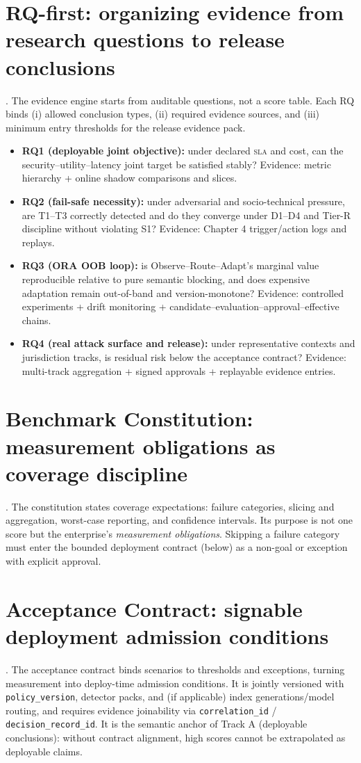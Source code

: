 \documentclass[11pt,a4paper]{report}
\begin{document}
\section{RQ-first: organizing evidence from research questions to release conclusions}
\EvalFramework{}. The evidence engine starts from auditable questions, not a score table. Each RQ binds (i) allowed conclusion types, (ii) required evidence sources, and (iii) minimum entry thresholds for the release evidence pack.
\begin{itemize}
  \item \textbf{RQ1 (deployable joint objective):} under declared \textsc{sla} and cost, can the security–utility–latency joint target be satisfied stably? Evidence: metric hierarchy + online shadow comparisons and slices.
  \item \textbf{RQ2 (fail-safe necessity):} under adversarial and socio-technical pressure, are T1--T3 correctly detected and do they converge under D1--D4 and Tier-R discipline without violating S1? Evidence: Chapter 4 trigger/action logs and replays.
  \item \textbf{RQ3 (ORA OOB loop):} is Observe--Route--Adapt’s marginal value reproducible relative to pure semantic blocking, and does expensive adaptation remain out-of-band and version-monotone? Evidence: controlled experiments + drift monitoring + candidate–evaluation–approval–effective chains.
  \item \textbf{RQ4 (real attack surface and release):} under representative contexts and jurisdiction tracks, is residual risk below the acceptance contract? Evidence: multi-track aggregation + signed approvals + replayable evidence entries.
\end{itemize}

\section{Benchmark Constitution: measurement obligations as coverage discipline}
\EvalFramework{}. The constitution states coverage expectations: failure categories, slicing and aggregation, worst-case reporting, and confidence intervals. Its purpose is not one score but the enterprise’s \emph{measurement obligations}. Skipping a failure category must enter the bounded deployment contract (below) as a non-goal or exception with explicit approval.

\section{Acceptance Contract: signable deployment admission conditions}
\EvalFramework{}. The acceptance contract binds scenarios to thresholds and exceptions, turning measurement into deploy-time admission conditions. It is jointly versioned with \texttt{policy\_version}, detector packs, and (if applicable) index generations/model routing, and requires evidence joinability via \texttt{correlation\_id} / \texttt{decision\_record\_id}. It is the semantic anchor of Track A (deployable conclusions): without contract alignment, high scores cannot be extrapolated as deployable claims.
\end{document}
